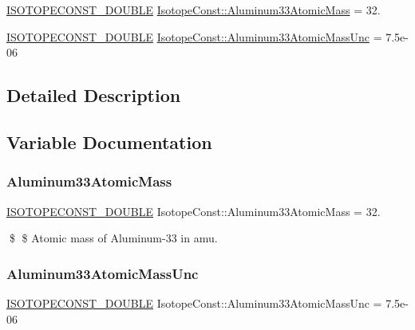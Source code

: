 \begin{DoxyCompactItemize}
\item 
\mbox{\hyperlink{group___isotope_const-_macros_ga8f45a7272ce02c0b4c65c44636ed719a}{I\+S\+O\+T\+O\+P\+E\+C\+O\+N\+S\+T\+\_\+\+D\+O\+U\+B\+LE}} \mbox{\hyperlink{group___isotope_const-_aluminum-_al33_gaea41852d86bc238665b64134fdf191fa}{Isotope\+Const\+::\+Aluminum33\+Atomic\+Mass}} = 32.
\item 
\mbox{\hyperlink{group___isotope_const-_macros_ga8f45a7272ce02c0b4c65c44636ed719a}{I\+S\+O\+T\+O\+P\+E\+C\+O\+N\+S\+T\+\_\+\+D\+O\+U\+B\+LE}} \mbox{\hyperlink{group___isotope_const-_aluminum-_al33_ga8dccd7f0b75e46518d5cb51b57a40dff}{Isotope\+Const\+::\+Aluminum33\+Atomic\+Mass\+Unc}} = 7.\+5e-\/06
\end{DoxyCompactItemize}


\subsection{Detailed Description}


\subsection{Variable Documentation}
\mbox{\label{group___isotope_const-_aluminum-_al33_gaea41852d86bc238665b64134fdf191fa}} 
\subsubsection{\texorpdfstring{Aluminum33\+Atomic\+Mass}{Aluminum33AtomicMass}}
{\footnotesize\ttfamily \mbox{\hyperlink{group___isotope_const-_macros_ga8f45a7272ce02c0b4c65c44636ed719a}{I\+S\+O\+T\+O\+P\+E\+C\+O\+N\+S\+T\+\_\+\+D\+O\+U\+B\+LE}} Isotope\+Const\+::\+Aluminum33\+Atomic\+Mass = 32.}

\$ \$ Atomic mass of Aluminum-\/33 in amu. \mbox{\label{group___isotope_const-_aluminum-_al33_ga8dccd7f0b75e46518d5cb51b57a40dff}} 
\subsubsection{\texorpdfstring{Aluminum33\+Atomic\+Mass\+Unc}{Aluminum33AtomicMassUnc}}
{\footnotesize\ttfamily \mbox{\hyperlink{group___isotope_const-_macros_ga8f45a7272ce02c0b4c65c44636ed719a}{I\+S\+O\+T\+O\+P\+E\+C\+O\+N\+S\+T\+\_\+\+D\+O\+U\+B\+LE}} Isotope\+Const\+::\+Aluminum33\+Atomic\+Mass\+Unc = 7.\+5e-\/06}

